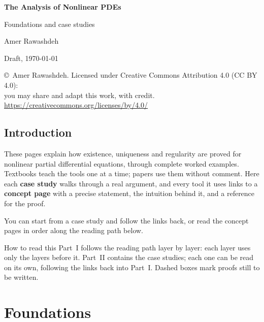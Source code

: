 \documentclass[11pt,openany]{book}
\begin{document}
\frontmatter
\begin{titlepage}\centering\vspace*{1.6in}
{\Huge\bfseries The Analysis of Nonlinear PDEs\par}\vspace{14pt}
{\Large Foundations and case studies\par}\vspace{40pt}
{\large Amer Rawashdeh\par}\vspace{8pt}
{\normalsize Draft, \today\par}\vfill
{\small \copyright\ Amer Rawashdeh. Licensed under Creative Commons Attribution 4.0 (CC BY 4.0):\\
you may share and adapt this work, with credit. \url{https://creativecommons.org/licenses/by/4.0/}\par}
\end{titlepage}

\chapter*{Introduction}
These pages explain how existence, uniqueness and regularity are proved for nonlinear partial differential equations, through complete worked examples. Textbooks teach the tools one at a time; papers use them without comment. Here each \textbf{case study} walks through a real argument, and every tool it uses links to a \textbf{concept page} with a precise statement, the intuition behind it, and a reference for the proof.

You can start from a case study and follow the links back, or read the concept pages in order along the reading path below.

\begin{pdfonly}
\begin{rmkbox}{How to read this}
Part~I follows the reading path layer by layer: each layer uses only the layers before it.
Part~II contains the case studies; each one can be read on its own, following the links back into Part~I. Dashed boxes mark proofs still to be written.
\end{rmkbox}
\end{pdfonly}

\tableofcontents

\mainmatter
\part{Foundations}
\end{document}
